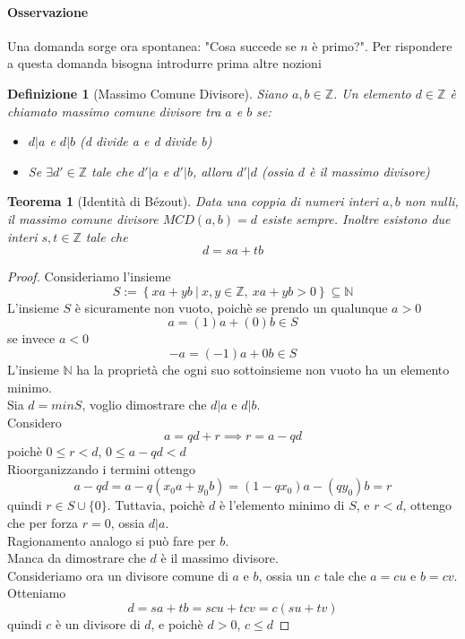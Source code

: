 \documentclass[a4paper]{report}
\newtheorem{theorem}{Teorema}
\newtheorem{definition}{Definizione}
\newcommand{\Z}{\ensuremath{\mathbb{Z}}}
\newcommand{\N}{\ensuremath{\mathbb{N}}}
\newcommand{\setst}[2]{\ensuremath{\left\{{#1}\ |\ {#2}\right\}}}
\begin{document}
\paragraph{Osservazione} Una domanda sorge ora spontanea: "Cosa succede se $n$ è primo?". Per rispondere a questa domanda bisogna introdurre prima altre nozioni
\begin{definition}[Massimo Comune Divisore]
    Siano $a,b\in\Z$. Un elemento $d\in\Z$ è chiamato massimo comune divisore tra $a$ e $b$ se:
    \begin{itemize}
        \item $d|a$ e $d|b$ (d divide a e d divide b)
        \item Se $\exists d'\in\Z$ tale che $d'|a$ e $d'|b$, allora $d'|d$ (ossia $d$ è il massimo divisore)
    \end{itemize}
\end{definition}
\begin{theorem}[Identità di Bézout]
    Data una coppia di numeri interi $a,b$ non nulli, il massimo comune divisore $MCD(a,b)=d$ esiste sempre. Inoltre esistono due interi $s,t\in\Z$ tale che
    \[
        d=sa+tb
    \]
\end{theorem}
\begin{proof}
    Consideriamo l'insieme
    \[
        S:=\setst{xa+yb}{x,y\in\Z,\ xa+yb>0}\subseteq\N
    \]
    L'insieme $S$ è sicuramente non vuoto, poichè se prendo un qualunque $a>0$
    \[
        a=(1)a+(0)b\in S
    \]
    se invece $a<0$
    \[
        -a=(-1)a+0b\in S
    \]
    L'insieme $\N$ ha la proprietà che ogni suo sottoinsieme non vuoto ha un elemento minimo.\\
    Sia $d=min S$, voglio dimostrare che $d|a$ e $d|b$.\\
    Considero
    \[
        a=qd+r\implies r=a-qd
    \]
    poichè $0\leq r<d$, $0\leq a-qd<d$\\
    Rioorganizzando i termini ottengo
    \[
        a-qd=a-q(x_0a+y_0b)=(1-qx_0)a-(qy_0)b=r
    \]
    quindi $r\in S\cup \{0\}$. Tuttavia, poichè $d$ è l'elemento minimo di $S$, e $r<d$, ottengo che per forza $r=0$, ossia $d|a$.\\
    Ragionamento analogo si può fare per $b$.\\
    Manca da dimostrare che $d$ è il massimo divisore.\\
    Consideriamo ora un divisore comune di $a$ e $b$, ossia un $c$ tale che $a=cu$ e $b=cv$. Otteniamo
    \[
        d=sa+tb=scu+tcv=c(su+tv)
    \]
    quindi $c$ è un divisore di $d$, e poichè $d>0$, $c\leq d$
\end{proof}
\end{document}
